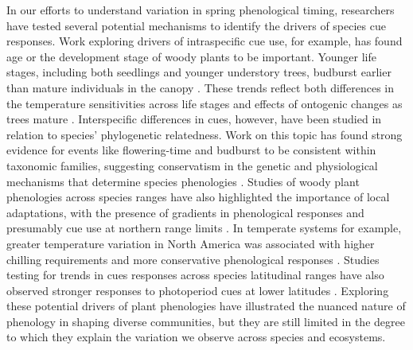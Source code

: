 \documentclass{article}\usepackage[]{graphicx}\usepackage[]{color}
\begin{document}
In our efforts to understand variation in spring phenological timing, researchers have tested several potential mechanisms to identify the drivers of species cue responses. Work exploring drivers of intraspecific cue use, for example, has found age or the development stage of woody plants to be important. Younger life stages, including both seedlings and younger understory trees, budburst earlier than mature individuals in the canopy \citep{Vitasse2013,Seiwa1991}. These trends reflect both differences in the temperature sensitivities across life stages and effects of ontogenic changes as trees mature \citep{Vitasse2013,Seiwa1991}. Interspecific differences in cues, however, have been studied in relation to species' phylogenetic relatedness. Work on this topic has found strong evidence for events like flowering-time and budburst to be consistent within taxonomic families, suggesting conservatism in the genetic and physiological mechanisms that determine species phenologies \citep{Kochmer1986,Davies2013,Gougherty2018}. Studies of woody plant phenologies across species ranges have also highlighted the importance of local adaptations, with the presence of gradients in phenological responses and presumably cue use at northern range limits \citep{Lechowicz1984,Chuine2001,Chuine2010}. In temperate systems for example, greater temperature variation in North America was associated with higher chilling requirements and more conservative phenological responses \citep{Zohner2017}.  Studies testing for trends in cues responses across species latitudinal ranges have also observed stronger responses to photoperiod cues at lower latitudes \citep{Zohner2016}. Exploring these potential drivers of plant phenologies have illustrated the nuanced nature of phenology in shaping diverse communities, but they are still limited in the degree to which they explain the variation we observe across species and ecosystems.\\
\end{document}
